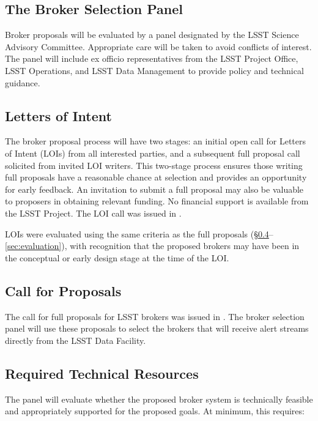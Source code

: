 \subsection{The Broker Selection Panel}

Broker proposals will be evaluated by a panel designated by the LSST Science Advisory Committee.  Appropriate care will be taken to avoid conflicts of interest.
The panel will include ex officio representatives from the LSST Project Office, LSST Operations, and LSST Data Management to provide policy and technical guidance.

\subsection{Letters of Intent} \label{sec:LOIs}

The broker proposal process will have two stages:
an initial open call for Letters of Intent (LOIs) from all interested parties, and a subsequent full proposal call solicited from invited LOI writers.
This two-stage process ensures those writing full proposals have a reasonable chance at selection and provides an opportunity for early feedback.
An invitation to submit a full proposal may also be valuable to proposers in obtaining relevant funding.
No financial support is available from the LSST Project.
The LOI call was issued in .

LOIs were evaluated using the same criteria as the full proposals (\S \ref{sec:resources}--\ref{sec:evaluation}), with recognition that the proposed brokers may have been in the conceptual or early design stage at the time of the LOI.

\subsection{Call for Proposals} \label{sec:CfP}

The call for full proposals for LSST brokers was issued in .
The broker selection panel will use these proposals to select the brokers that will receive alert streams directly from the LSST Data Facility.

\subsection{Required Technical Resources} \label{sec:resources}

The panel will evaluate whether the proposed broker system is technically feasible and appropriately supported for the proposed goals.
At minimum, this requires:


